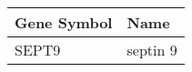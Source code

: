 \begin{tabular}{ll}
\toprule
Gene Symbol &     Name \\
\midrule
      SEPT9 & septin 9 \\
\bottomrule
\end{tabular}

